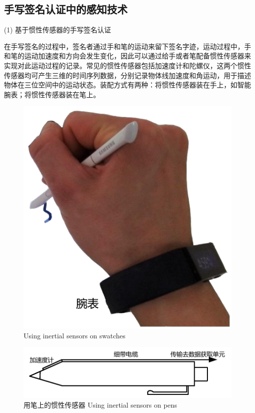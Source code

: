 \subsection{手写签名认证中的感知技术}
(1) 基于惯性传感器的手写签名认证
  
在手写签名的过程中，签名者通过手和笔的运动来留下签名字迹，运动过程中，手和笔的运动加速度和方向会发生变化，因此可以通过给手或者笔配备惯性传感器来实现对此运动过程的记录。常见的惯性传感器包括加速度计和陀螺仪，这两个惯性传感器均可产生三维的时间序列数据，分别记录物体线加速度和角运动，用于描述物体在三位空间中的运动状态。装配方式有两种：将惯性传感器装在手上，如智能腕表；将惯性传感器装在笔上。

\begin{figure}
  \centering
  \begin{minipage}[t]{0.3\textwidth}
    \centering
    \includegraphics[width=\textwidth]{figure/smartwatch.pdf}
      {Using inertial sensors on swatches}
        \label{fig:smartwatch-inertial-sensor}
  \end{minipage}
  \centering
  \begin{minipage}[t]{0.49\textwidth}
    \centering
    \includegraphics[width=\textwidth]{figure/acceleration-pen.pdf}
    \bicaption
    {用笔上的惯性传感器}
    {Using inertial sensors on pens}
    \label{fig:pen-inertial-sensor}
   \end{minipage}
\end{figure}
